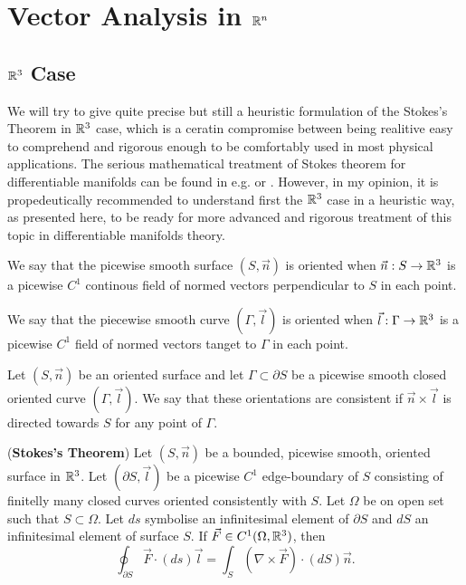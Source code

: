 \documentclass[main.tex]{subfiles}
\begin{document}
\section{Vector Analysis in $\mathbb{R}^n$}
\subsection{$\mathbb{R}^3$ Case}
We will try to give quite precise but still a heuristic formulation of the Stokes's Theorem in $\mathbb{R}^3$ case, which is a ceratin compromise between being realitive easy to comprehend and rigorous enough to be comfortably used in most physical applications. The serious mathematical treatment of Stokes theorem for differentiable manifolds can be found in  e.g. \cite{spivak1995} or \cite{warner1983}. However, in my opinion, it is propedeutically recommended to understand first the $\mathbb{R}^3$ case in a heuristic way, as presented here, to be ready for more advanced and rigorous treatment of this topic in differentiable manifolds theory. 
\begin{definition}
\label{orientation-2d}
We say that the picewise smooth surface $(S, \vec{n})$ is oriented when $\vec{n}:S\to \mathbb{R}^3$ is a picewise $C^1$ continous field of normed vectors perpendicular to $S$ in each point.  
\end{definition}
\begin{definition}
\label{orientation-1d}
We say that the piecewise smooth curve $(\Gamma, \vec{l})$ is oriented when $\vec{l}:\Gamma\to\mathbb{R}^3$ is a picewise $C^1$ field of normed vectors tanget to $\Gamma$ in each point.
\end{definition}
\begin{definition}
\label{consistent-orientation-2d}
Let $(S,\vec{n})$ be an oriented surface and let $\Gamma \subset \partial S$ be a picewise smooth closed oriented curve $(\Gamma, \vec{l})$. We say that these orientations are consistent if $\vec{n}\times \vec{l}$ is directed towards $S$ for any point of $\Gamma$.
\end{definition}
\begin{theorem} (\textbf{Stokes's Theorem})
Let $(S, \vec{n})$ be a bounded, picewise smooth, oriented surface in $\mathbb{R}^3$. Let $(\partial S, \vec{l})$ be a picewise $C^1$ edge-boundary of $S$ consisting of finitelly many closed curves oriented consistently with $S$. Let $\Omega$ be on open set such that $S\subset \Omega$. Let $ds$ symbolise an infinitesimal element of $\partial S$ and $dS$ an infinitesimal element of surface $S$. If $\vec{F}\in C^1(\Omega, \mathbb{R}^3)$, then
\begin{equation}
\oint_{\partial S} \vec{F} \cdot (ds)\vec{l} = \int_S (\nabla \times \vec{F}) \cdot (dS)\vec{n}.
\end{equation}
\end{theorem}
\end{document}
